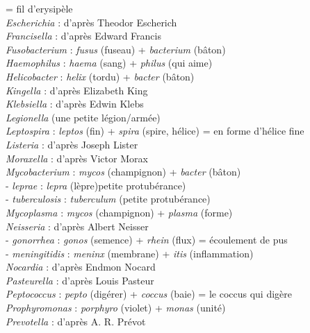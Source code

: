 = fil d'erysipèle\\
\emph{Escherichia} : d'après Theodor Escherich\\
\emph{Francisella} : d'après Edward Francis\\
\emph{Fusobacterium} : \emph{fusus} (fuseau) + \emph{bacterium}
(bâton)\\
\emph{Haemophilus} : \emph{haema} (sang) + \emph{philus} (qui aime)\\
\emph{Helicobacter} : \emph{helix} (tordu) + \emph{bacter} (bâton)\\
\emph{Kingella} : d'après Elizabeth King\\
\emph{Klebsiella} : d'après Edwin Klebs\\
\emph{Legionella} (une petite légion/armée)\\
\emph{Leptospira} : \emph{leptos} (fin) + \emph{spira} (spire, hélice) =
en forme d'hélice fine\\
\emph{Listeria} : d'après Joseph Lister\\
\emph{Moraxella} : d'après Victor Morax\\
\emph{Mycobacterium} : \emph{mycos} (champignon) + \emph{bacter}
(bâton)\\
\hspace*{0.333em} - \emph{leprae} : \emph{lepra} (lèpre)petite
protubérance)\\
\hspace*{0.333em} - \emph{tuberculosis} : \emph{tuberculum} (petite
protubérance)\\
\emph{Mycoplasma} : \emph{mycos} (champignon) + \emph{plasma} (forme)\\
\emph{Neisseria} : d'après Albert Neisser\\
\hspace*{0.333em} - \emph{gonorrhea} : \emph{gonos} (semence) +
\emph{rhein} (flux) = écoulement de pus\\
\hspace*{0.333em} - \emph{meningitidis} : \emph{meninx} (membrane) +
\emph{itis} (inflammation)\\
\emph{Nocardia} : d'après Endmon Nocard\\
\emph{Pasteurella} : d'après Louis Pasteur\\
\emph{Peptococcus} : \emph{pepto} (digérer) + \emph{coccus} (baie) = le
coccus qui digère\\
\emph{Prophyromonas} : \emph{porphyro} (violet) + \emph{monas} (unité)\\
\emph{Prevotella} : d'après A. R. Prévot\\
